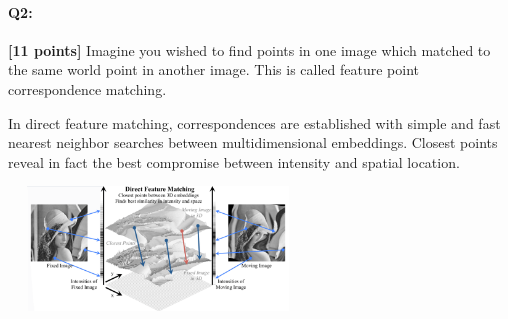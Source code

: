 \documentclass[11pt]{article}
\begin{document}





\pagebreak

\paragraph{Q2:} \textbf{[11 points]} Imagine you wished to find points in one image which matched to the same world point in another image. This is called feature point correspondence matching.

In direct feature matching, correspondences are established with simple and fast nearest neighbor searches between multidimensional embeddings. Closest points reveal in fact the best compromise between intensity and spatial location.

\begin{center}
\includegraphics[width=300px,height=125px]{images/Direct-Feature-Matching-Correspondences-are-established-with-simple-and-fast-nearest.png} 
\end{center}
\end{document}
